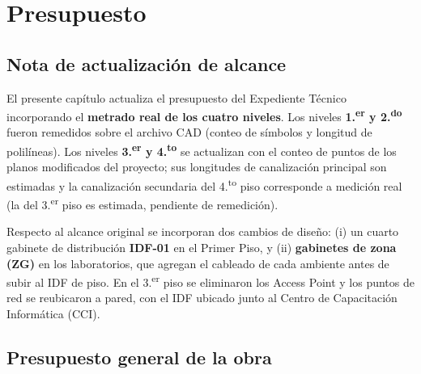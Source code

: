 \chapter{Presupuesto}


\section{Nota de actualización de alcance}

El presente capítulo actualiza el presupuesto del Expediente Técnico incorporando el
\textbf{metrado real de los cuatro niveles}. Los niveles \textbf{1.\textsuperscript{er} y
2.\textsuperscript{do}} fueron remedidos sobre el archivo CAD (conteo de símbolos y
longitud de polilíneas). Los niveles \textbf{3.\textsuperscript{er} y 4.\textsuperscript{to}}
se actualizan con el conteo de puntos de los planos modificados del proyecto; sus
longitudes de canalización principal son estimadas y la canalización secundaria del
4.\textsuperscript{to} piso corresponde a medición real (la del 3.\textsuperscript{er}
piso es estimada, pendiente de remedición).

Respecto al alcance original se incorporan dos cambios de diseño: (i) un cuarto gabinete
de distribución \textbf{IDF-01} en el Primer Piso, y (ii) \textbf{gabinetes de zona (ZG)}
en los laboratorios, que agregan el cableado de cada ambiente antes de subir al IDF de
piso. En el 3.\textsuperscript{er} piso se eliminaron los Access Point y los puntos de red
se reubicaron a pared, con el IDF ubicado junto al Centro de Capacitación Informática (CCI).

\section{Presupuesto general de la obra}


